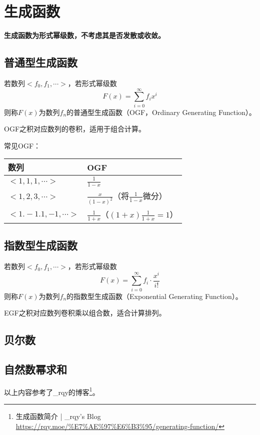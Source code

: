 \section{生成函数}
{\bfseries 生成函数为形式幂级数，不考虑其是否发散或收敛。}
\subsection{普通型生成函数}
若数列$<f_0,f_1,\cdots>$，若形式幂级数
\begin{displaymath}
    F(x)=\sum_{i=0}^\infty{f_ix^i}
\end{displaymath}
则称$F(x)$为数列${f_n}$的普通型生成函数（OGF，Ordinary Generating Function）。

OGF之积对应数列的卷积，适用于组合计算。

常见OGF：
\begin{tabular}{|l|l|}
    \hline
    数列&OGF\\
    \hline
    $<1,1,1,\cdots>$&$\frac{1}{1-x}$\\
    \hline
    $<1,2,3,\cdots>$&$\frac{x}{(1-x)^2}$（将$\frac{1}{1-x}$微分）\\
    \hline
    $<1.-1.1,-1,\cdots>$&$\frac{1}{1+x}$（$(1+x)\frac{1}{1+x}=1$）\\
    \hline
\end{tabular}
\subsection{指数型生成函数}
若数列$<f_0,f_1,\cdots>$，若形式幂级数
\begin{displaymath}
    F(x)=\sum_{i=0}^\infty{f_i\cdot\frac{x^i}{i!}}
\end{displaymath}
则称$F(x)$为数列${f_n}$的指数型生成函数（Exponential Generating Function）。

EGF之积对应数列卷积乘以组合数，适合计算排列。

\subsection{贝尔数}
\subsection{自然数幂求和}
以上内容参考了\_rqy的博客\footnote{生成函数简介 | \_rqy's Blog\\
    \url{https://rqy.moe/\%E7\%AE\%97\%E6\%B3\%95/generating-function/}
}。
